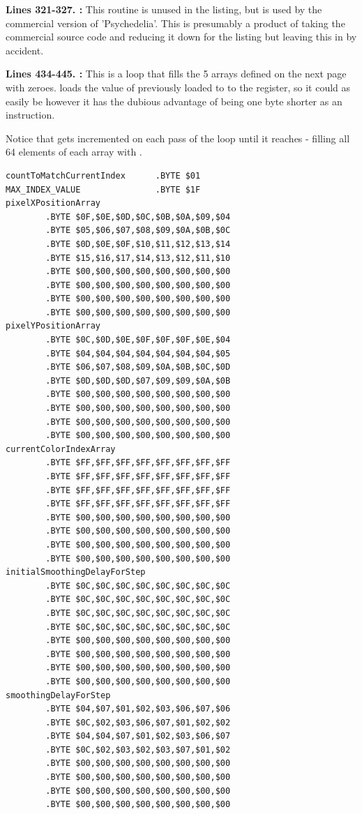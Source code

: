 {\bigskip
\bigskip
\bigskip
\bigskip
\bigskip
\bigskip
\bigskip
\bigskip
\bigskip
\bigskip
\bigskip
\bigskip
\textbf{Lines 321-327. :} This routine is unused in the listing, but is used by the commercial version of 'Psychedelia'. This is
presumably a product of taking the commercial source code and reducing it down for the listing but 
leaving this in by accident.

\bigskip
\bigskip
\bigskip
\bigskip
\textbf{Lines 434-445. :} This is a loop that fills the 5 arrays defined on the next page with zeroes.
 loads the value of  previously loaded to  to the  register, so it could as easily be 
however it has the dubious advantage of being one byte shorter as an instruction.

Notice that  gets incremented on each pass of the loop until it reaches  - filling all 64 elements of each array with
.
\clearpage
\begin{lstlisting}[caption = The pixel buffers\, each 64 bytes long though only 32 bytes are used in this version thanks to \icode{MAX\_INDEX\_VALUE}
being set to \icode{\$1F} (32).]
countToMatchCurrentIndex      .BYTE $01
MAX_INDEX_VALUE               .BYTE $1F
pixelXPositionArray   
        .BYTE $0F,$0E,$0D,$0C,$0B,$0A,$09,$04
        .BYTE $05,$06,$07,$08,$09,$0A,$0B,$0C
        .BYTE $0D,$0E,$0F,$10,$11,$12,$13,$14
        .BYTE $15,$16,$17,$14,$13,$12,$11,$10
        .BYTE $00,$00,$00,$00,$00,$00,$00,$00
        .BYTE $00,$00,$00,$00,$00,$00,$00,$00
        .BYTE $00,$00,$00,$00,$00,$00,$00,$00
        .BYTE $00,$00,$00,$00,$00,$00,$00,$00
pixelYPositionArray   
        .BYTE $0C,$0D,$0E,$0F,$0F,$0F,$0E,$04
        .BYTE $04,$04,$04,$04,$04,$04,$04,$05
        .BYTE $06,$07,$08,$09,$0A,$0B,$0C,$0D
        .BYTE $0D,$0D,$0D,$07,$09,$09,$0A,$0B
        .BYTE $00,$00,$00,$00,$00,$00,$00,$00
        .BYTE $00,$00,$00,$00,$00,$00,$00,$00
        .BYTE $00,$00,$00,$00,$00,$00,$00,$00
        .BYTE $00,$00,$00,$00,$00,$00,$00,$00
currentColorIndexArray   
        .BYTE $FF,$FF,$FF,$FF,$FF,$FF,$FF,$FF
        .BYTE $FF,$FF,$FF,$FF,$FF,$FF,$FF,$FF
        .BYTE $FF,$FF,$FF,$FF,$FF,$FF,$FF,$FF
        .BYTE $FF,$FF,$FF,$FF,$FF,$FF,$FF,$FF
        .BYTE $00,$00,$00,$00,$00,$00,$00,$00
        .BYTE $00,$00,$00,$00,$00,$00,$00,$00
        .BYTE $00,$00,$00,$00,$00,$00,$00,$00
        .BYTE $00,$00,$00,$00,$00,$00,$00,$00
initialSmoothingDelayForStep   
        .BYTE $0C,$0C,$0C,$0C,$0C,$0C,$0C,$0C
        .BYTE $0C,$0C,$0C,$0C,$0C,$0C,$0C,$0C
        .BYTE $0C,$0C,$0C,$0C,$0C,$0C,$0C,$0C
        .BYTE $0C,$0C,$0C,$0C,$0C,$0C,$0C,$0C
        .BYTE $00,$00,$00,$00,$00,$00,$00,$00
        .BYTE $00,$00,$00,$00,$00,$00,$00,$00
        .BYTE $00,$00,$00,$00,$00,$00,$00,$00
        .BYTE $00,$00,$00,$00,$00,$00,$00,$00
smoothingDelayForStep   
        .BYTE $04,$07,$01,$02,$03,$06,$07,$06
        .BYTE $0C,$02,$03,$06,$07,$01,$02,$02
        .BYTE $04,$04,$07,$01,$02,$03,$06,$07
        .BYTE $0C,$02,$03,$02,$03,$07,$01,$02
        .BYTE $00,$00,$00,$00,$00,$00,$00,$00
        .BYTE $00,$00,$00,$00,$00,$00,$00,$00
        .BYTE $00,$00,$00,$00,$00,$00,$00,$00
        .BYTE $00,$00,$00,$00,$00,$00,$00,$00



\end{lstlisting}}
